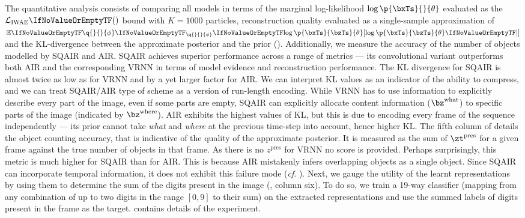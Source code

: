 The quantitative analysis consists of comparing all models in terms of the marginal log-likelihood $\log \p{\bxTs}{}{\theta}$ evaluated as the $\loss[\textsc{IWAE}]$ bound with $K=1000$ particles, reconstruction quality evaluated as a single-sample approximation of $\expc[\q{}{}{\phi}]{\log \p{\bxTs}{\bzTs}{\theta}}$ and the \gls{KL}-divergence between the approximate posterior and the prior (). Additionally, we measure the accuracy of the number of objects modelled by \gls{SQAIR} and \gls{AIR}. \Gls{SQAIR} achieves superior performance across a range of metrics --- its convolutional variant outperforms both \gls{AIR} and the corresponding \gls{VRNN} in terms of model evidence and reconstruction performance. 
% 
The \gls{KL} divergence for \gls{SQAIR} is almost twice as low as for \gls{VRNN} and by a yet larger factor for \gls{AIR}.
We can interpret \gls{KL} values as an indicator of the ability to compress, and we can treat \gls{SQAIR}/\gls{AIR} type of scheme as a version of run-length encoding.
While \gls{VRNN} has to use information to explicitly describe every part of the image, even if some parts are empty, \gls{SQAIR} can explicitly allocate content information ($\bz^\mathrm{what}$) to specific parts of the image (indicated by $\bz^\mathrm{where}$).
\Gls{AIR} exhibits the highest values of \gls{KL}, but this is due to encoding every frame of the sequence independently --- its prior cannot take \textit{what} and \textit{where} at the previous time-step into account, hence higher KL.
% 
The fifth column of  details the object counting accuracy, that is indicative of the quality of the approximate posterior. It is measured as the sum of $\zt^\mathrm{pres}$ for a given frame against the true number of objects in that frame. As there is no $z^\mathrm{pres}$ for \gls{VRNN} no score is provided. Perhaps surprisingly, this metric is much higher for \gls{SQAIR} than for \gls{AIR}. This is because \gls{AIR} mistakenly infers overlapping objects as a single object. Since \gls{SQAIR} can incorporate temporal information, it does not exhibit this failure mode (\textit{cf}. ).
Next, we gauge the utility of the learnt representations by using them to determine the sum of the digits present in the image (, column six). To do so, we train a 19-way classifier (mapping from any combination of up to two digits in the range $[0, 9]$ to their sum) on the extracted representations and use the summed labels of digits present in the frame as the target.  contains details of the experiment. 
